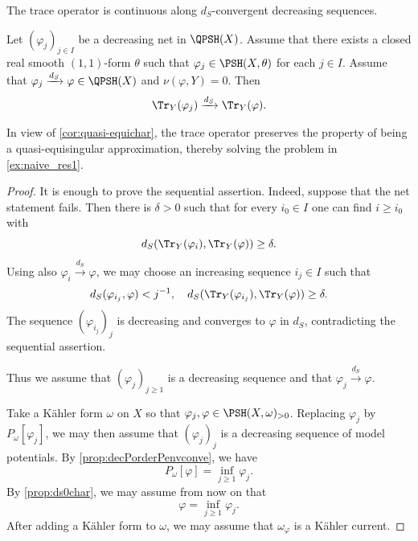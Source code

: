 The trace operator is continuous along $d_S$-convergent decreasing sequences.
\begin{proposition}\label{prop:tracedeclimit}
    Let $(\varphi_j)_{j\in I}$ be a decreasing net in $\QPSH(X)$. Assume that there exists a closed real smooth $(1,1)$-form $\theta$ such that $\varphi_j\in \PSH(X,\theta)$ for each $j\in I$. Assume that $\varphi_j\xrightarrow{d_S}\varphi\in \QPSH(X)$ and $\nu(\varphi,Y)=0$. Then
    \[
        \Tr_Y(\varphi_j)\xrightarrow{d_S}\Tr_Y(\varphi).
    \]
\end{proposition}
In view of \cref{cor:quasi-equichar}, the trace operator preserves the property of being a quasi-equisingular approximation, thereby solving the problem in \cref{ex:naive_res1}.
\begin{proof}
    It is enough to prove the sequential assertion. Indeed, suppose that the net statement fails. Then there is $\delta>0$ such that for every $i_0\in I$ one can find $i\geq i_0$ with
    \[
        d_S(\Tr_Y(\varphi_i),\Tr_Y(\varphi))\geq\delta.
    \]
    Using also $\varphi_i\xrightarrow{d_S}\varphi$, we may choose an increasing sequence $i_j\in I$ such that
    \[
        d_S(\varphi_{i_j},\varphi)<j^{-1},\quad d_S(\Tr_Y(\varphi_{i_j}),\Tr_Y(\varphi))\geq\delta.
    \]
    The sequence $(\varphi_{i_j})_j$ is decreasing and converges to $\varphi$ in $d_S$, contradicting the sequential assertion.

    Thus we assume that $(\varphi_j)_{j\geq 1}$ is a decreasing sequence and that $\varphi_j\xrightarrow{d_S}\varphi$.

    Take a Kähler form $\omega$ on $X$ so that $\varphi_j,\varphi\in \PSH(X,\omega)_{>0}$.  Replacing $\varphi_j$ by $P_{\omega}[\varphi_j]$, we may then assume that $(\varphi_j)_j$ is a decreasing sequence of model potentials. By \cref{prop:decPorderPenvconve}, we have
    \[
        P_{\omega}[\varphi]=\inf_{j\geq 1}\varphi_j.
    \]
    By \cref{prop:ds0char}, we may assume from now on that
    \[
        \varphi=\inf_{j\geq 1}\varphi_j.
    \]
    After adding a Kähler form to $\omega$, we may assume that $\omega_{\varphi}$ is a Kähler current.



\end{proof}
